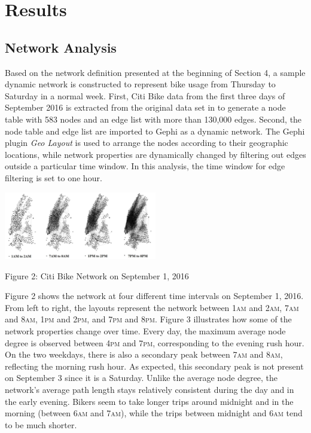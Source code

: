 \documentclass[times, 10pt,twocolumn]{article}
\begin{document}
\section{Results}

\subsection{Network Analysis}
Based on the network definition presented at the beginning of Section 4, a sample dynamic network is constructed to represent bike usage from Thursday to Saturday in a normal week. First, Citi Bike data from the first three days of September 2016 is extracted from the original data set in \cite{dataset} to generate a node table with 583 nodes and an edge list with more than 130,000 edges. Second, the node table and edge list are imported to Gephi as a dynamic network. The Gephi plugin \textit{Geo Layout} is used to arrange the nodes according to their geographic locations, while network properties are dynamically changed by filtering out edges outside a particular time window. In this analysis, the time window for edge filtering is set to one hour.\\

\centerline{\includegraphics[width=0.5\textwidth]{m4/combined.jpg}}
\centerline{Figure 2: Citi Bike Network on September 1, 2016}
\hfill \break
\indent Figure 2 shows the network at four different time intervals on September 1, 2016. From left to right, the layouts represent the network between 1\textsc{am} and 2\textsc{am}, 7\textsc{am} and 8\textsc{am}, 1\textsc{pm} and 2\textsc{pm}, and 7\textsc{pm} and 8\textsc{pm}. Figure 3 illustrates how some of the network properties change over time. Every day, the maximum average node degree is observed between 4\textsc{pm} and 7\textsc{pm}, corresponding to the evening rush hour. On the two weekdays, there is also a secondary peak between 7\textsc{am} and 8\textsc{am}, reflecting the morning rush hour. As expected, this secondary peak is not present on September 3 since it is a Saturday. Unlike the average node degree, the network's average path length stays relatively consistent during the day and in the early evening. Bikers seem to take longer trips around midnight and in the morning (between 6\textsc{am} and 7\textsc{am}), while the trips between midnight and 6\textsc{am} tend to be much shorter.
\end{document}
